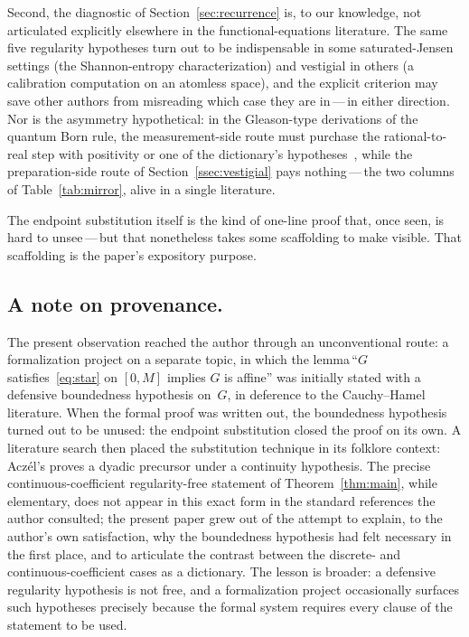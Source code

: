 \documentclass{article}
\theoremstyle{plain}
\theoremstyle{definition}
\begin{document}
Second, the diagnostic of Section~\ref{sec:recurrence} is, to our
knowledge, not articulated explicitly elsewhere in the
functional-equations literature. The same five regularity hypotheses
turn out to be indispensable in some saturated-Jensen settings (the
Shannon-entropy characterization) and vestigial in others (a
calibration computation on an atomless space), and the explicit
criterion may save other authors from misreading which case they are
in\,---\,in either direction. Nor is the asymmetry hypothetical: in
the Gleason-type derivations of the quantum Born rule, the
measurement-side route must purchase the rational-to-real step with
positivity or one of the dictionary's
hypotheses~\cite{Gleason1957,Busch2003,CFMR2004,WrightWeigert2019,WrightWeigert2020},
while the preparation-side route of Section~\ref{ssec:vestigial} pays
nothing\,---\,the two columns of Table~\ref{tab:mirror}, alive in a
single literature.

The endpoint substitution itself is the kind of one-line proof that, once
seen, is hard to unsee\,---\,but that nonetheless takes some scaffolding to
make visible. That scaffolding is the paper's expository purpose.

\subsection*{A note on provenance.}

The present observation reached the author through an unconventional
route: a formalization project on a separate topic, in which the
lemma\,``$G$ satisfies~\eqref{eq:star} on $[0,M]$ implies $G$ is
affine'' was initially stated with a defensive boundedness hypothesis
on~$G$, in deference to the Cauchy--Hamel literature. When the formal
proof was written out, the boundedness hypothesis turned out to be
unused: the endpoint substitution closed the proof on its own.
A literature search then placed the substitution technique in its folklore context: Acz\'el's \cite[\S2.1.4]{Aczel1966} proves a dyadic precursor
under a continuity hypothesis. The precise continuous-coefficient
regularity-free statement of Theorem~\ref{thm:main}, while elementary,
does not appear in this exact form in the standard references the
author consulted; the present paper grew out of the attempt to explain,
to the author's own satisfaction, why the boundedness hypothesis had
felt necessary in the first place, and to articulate the contrast
between the discrete- and continuous-coefficient cases as a dictionary.
The lesson is
broader: a defensive regularity hypothesis is not free, and a
formalization project occasionally surfaces such hypotheses precisely
because the formal system requires every clause of the statement to be
used.
\end{document}
